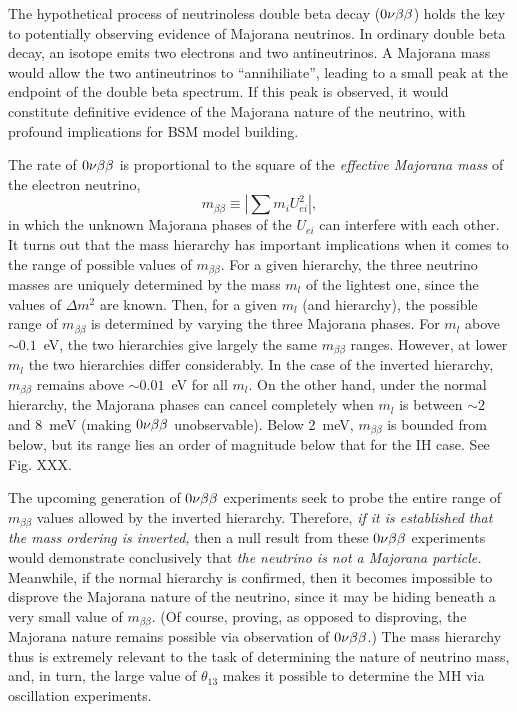 \documentclass[../thesis.tex]{subfiles}
\begin{document}
The hypothetical process of neutrinoless double beta decay ($0\nu\beta\beta$) holds the key to potentially observing evidence of Majorana neutrinos. In ordinary double beta decay, an isotope emits two electrons and two antineutrinos. A Majorana mass would allow the two antineutrinos to ``annihiliate'', leading to a small peak at the endpoint of the double beta spectrum. If this peak is observed, it would constitute definitive evidence of the Majorana nature of the neutrino, with profound implications for BSM model building.

The rate of $0\nu\beta\beta$ is proportional to the square of the \emph{effective Majorana mass} of the electron neutrino,
\begin{equation*}
  m_{\beta\beta} \equiv \left| \sum m_i U^2_{ei} \right|,
\end{equation*}
in which the unknown Majorana phases of the $U_{ei}$ can interfere with each other. It turns out that the mass hierarchy has important implications when it comes to the range of possible values of $m_{\beta\beta}$. For a given hierarchy, the three neutrino masses are uniquely determined by the mass $m_l$ of the lightest one, since the values of $\Delta m^2$ are known. Then, for a given $m_l$ (and hierarchy), the possible range of $m_{\beta\beta}$ is determined by varying the three Majorana phases. For $m_l$ above $\sim0.1$~eV, the two hierarchies give largely the same $m_{\beta\beta}$ ranges. However, at lower $m_l$ the two hierarchies differ considerably. In the case of the inverted hierarchy, $m_{\beta\beta}$ remains above $\sim0.01$~eV for all $m_l$. On the other hand, under the normal hierarchy, the Majorana phases can cancel completely when $m_l$ is between $\sim2$ and 8~meV (making $0\nu\beta\beta$ unobservable). Below 2~meV, $m_{\beta\beta}$ is bounded from below, but its range lies an order of magnitude below that for the IH case. See Fig. XXX.

The upcoming generation of $0\nu\beta\beta$ experiments seek to probe the entire range of $m_{\beta\beta}$ values allowed by the inverted hierarchy. Therefore, \emph{if it is established that the mass ordering is inverted,} then a null result from these $0\nu\beta\beta$ experiments would demonstrate conclusively that \emph{the neutrino is not a Majorana particle.} Meanwhile, if the normal hierarchy is confirmed, then it becomes impossible to disprove the Majorana nature of the neutrino, since it may be hiding beneath a very small value of $m_{\beta\beta}$. (Of course, proving, as opposed to disproving, the Majorana nature remains possible via observation of $0\nu\beta\beta$.) The mass hierarchy thus is extremely relevant to the task of determining the nature of neutrino mass, and, in turn, the large value of $\theta_{13}$ makes it possible to determine the MH via oscillation experiments.
\end{document}
